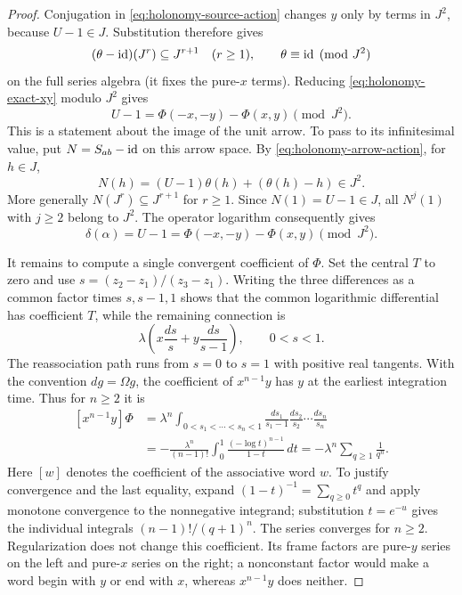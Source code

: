 \begin{proof}
Conjugation in \eqref{eq:holonomy-source-action} changes $y$ only by
terms in $J^2$, because $U-1\in J$.  Substitution therefore gives
\[
 (\theta-\mathrm{id})(J^r)\subseteq J^{r+1}\quad(r\geq1),
 \qquad\theta\equiv\mathrm{id}\pmod{J^2}
\]
on the full series algebra (it fixes the pure-$x$ terms).
Reducing \eqref{eq:holonomy-exact-xy} modulo $J^2$ gives
\begin{equation}\label{eq:holonomy-unit-difference}
 U-1=\Phi(-x,-y)-\Phi(x,y)\pmod{J^2}.
\end{equation}
This is a statement about the image of the unit arrow.  To pass to its
infinitesimal value, put $N=S_{ab}-\mathrm{id}$ on this arrow space.  By
\eqref{eq:holonomy-arrow-action}, for $h\in J$,
\[
 N(h)=(U-1)\theta(h)+(\theta(h)-h)\in J^2.
\]
More generally $N(J^r)\subseteq J^{r+1}$ for $r\geq1$.
Since $N(1)=U-1\in J$, all $N^j(1)$ with $j\geq2$ belong to $J^2$.
The operator logarithm consequently gives
\begin{equation}\label{eq:holonomy-log-depth-one}
 \delta(\alpha)=U-1
 =\Phi(-x,-y)-\Phi(x,y)\pmod{J^2}.
\end{equation}

It remains to compute a single convergent coefficient of $\Phi$.
Set the central $T$ to zero and use
$s=(z_2-z_1)/(z_3-z_1)$.  Writing the three differences as a common
factor times $s,s-1,1$ shows that the common logarithmic differential
has coefficient $T$, while the remaining connection is
\begin{equation}\label{eq:holonomy-interval-connection}
 \lambda\left(x\frac{ds}{s}+y\frac{ds}{s-1}\right),
 \qquad 0<s<1.
\end{equation}
The reassociation path runs from $s=0$ to $s=1$ with positive real
tangents.  With the convention $dg=\Omega g$, the coefficient of
$x^{n-1}y$ has $y$ at the earliest integration time.  Thus for $n\geq2$
it is
\begin{equation}\label{eq:holonomy-zeta-integral}
\begin{split}
 [x^{n-1}y]\Phi
 &=\lambda^n
 \int_{0<s_1<\cdots<s_n<1}
 \frac{ds_1}{s_1-1}\frac{ds_2}{s_2}\cdots\frac{ds_n}{s_n}\\
 &=-\frac{\lambda^n}{(n-1)!}
 \int_0^1\frac{(-\log t)^{n-1}}{1-t}\,dt
 =-\lambda^n\sum_{q\geq1}\frac1{q^n}.
\end{split}
\end{equation}
Here $[w]$ denotes the coefficient of the associative word $w$.
To justify convergence and the last equality, expand
$(1-t)^{-1}=\sum_{q\geq0}t^q$ and apply monotone convergence to the
nonnegative integrand; substitution $t=e^{-u}$ gives the individual
integrals $(n-1)!/(q+1)^n$.  The series converges for $n\geq2$.
Regularization does not change this coefficient.  Its frame factors
are pure-$y$ series on the left and pure-$x$ series on the right; a
nonconstant factor would make a word begin with $y$ or end with $x$,
whereas $x^{n-1}y$ does neither.


\end{proof}
